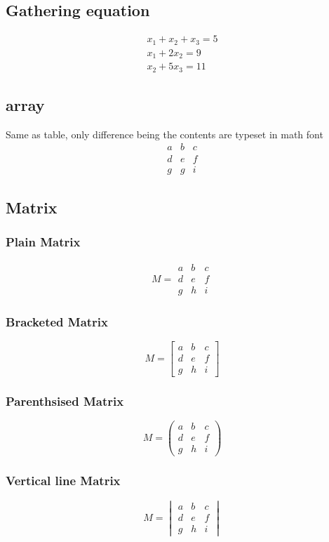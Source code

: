 \subsection{Gathering equation}
\begin{gather}
x_1 + x_2 + x_3 = 5 \\
x_1 + 2x_2  = 9 \\
x_2 + 5x_3  = 11
\end{gather}

\subsection{array}
Same as table, only difference being the contents are typeset in math font
\begin{equation}
\begin{array}{|ccc|}
a & b & c \\
d & e & f  \\
g & g & i
\end{array}
\end{equation}

\subsection{Matrix}
\subsubsection{Plain Matrix}
\begin{equation}
M = 
\begin{matrix}
	a & b & c \\
	d & e & f \\
	g & h & i 
\end{matrix}
\end{equation}


\subsubsection{Bracketed Matrix}
\begin{equation}
M = 
\begin{bmatrix}
	a & b & c \\
	d & e & f \\
	g & h & i 
\end{bmatrix}
\end{equation}

\subsubsection{Parenthsised Matrix}
\begin{equation}
M = 
\begin{pmatrix}
	a & b & c \\
	d & e & f \\
	g & h & i 
\end{pmatrix}
\end{equation}


\subsubsection{Vertical line Matrix}
\begin{equation}
M = 
\begin{vmatrix}
	a & b & c \\
	d & e & f \\
	g & h & i 
\end{vmatrix}
\end{equation}




